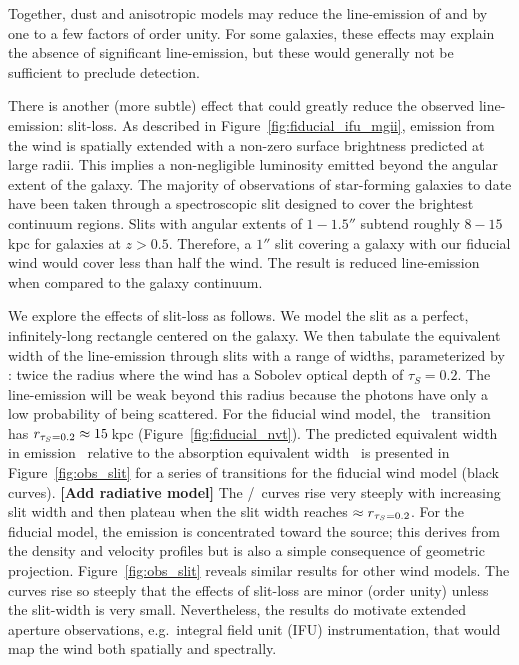 \documentclass[12pt,preprint]{aastex}
\begin{document}
Together, dust and anisotropic models may reduce the line-emission
of  and 
by one to a few factors of order unity.  For some galaxies, these
effects may explain the absence of significant line-emission,
but these would generally
not be sufficient to preclude detection. 

There is another (more subtle) effect that could
greatly reduce the observed line-emission: slit-loss.  As
described in Figure~\ref{fig:fiducial_ifu_mgii}, 
emission from the wind is spatially extended with
a non-zero surface brightness predicted at large radii. This implies 
a non-negligible luminosity emitted beyond the angular extent of the galaxy.  
The majority of observations of star-forming galaxies to date have
been taken through a spectroscopic slit designed to cover
the brightest continuum regions. Slits with angular
extents of $1-1.5''$ subtend roughly $8-15$\,kpc for galaxies at $z>0.5$.
Therefore, a $1''$ slit covering a galaxy with our fiducial wind would cover
less than half the wind.  The result is reduced line-emission
when compared to the galaxy continuum.

We explore the effects of slit-loss as follows.
We model the slit as a perfect, infinitely-long rectangle centered on the
galaxy.  We then tabulate the equivalent width of the line-emission
through slits with a range of widths, parameterized by \rtt: twice the radius
where the wind has a Sobolev optical depth of $\tau_S = 0.2$. 
The line-emission will be weak beyond
this radius because the photons have only a low probability of
being scattered.  For the fiducial wind model, 
the \mgiia\ transition has $r_{\tau_S = 0.2} \approx 15$\,kpc 
(Figure~\ref{fig:fiducial_nvt}).  
The predicted equivalent width in emission \ewe\ relative to the absorption
equivalent width \ewabs\ is presented in
Figure~\ref{fig:obs_slit} for a series of transitions for the fiducial
wind model (black curves).
{\bf [Add radiative model]}
The \ewe/\ewabs\ curves rise very steeply with increasing slit width and then
plateau when the slit width reaches $\approx r_{\tau_S = 0.2}$.  
For the fiducial model, the emission is concentrated toward the source; this
derives from the density and velocity profiles but is also a simple
consequence of geometric projection.
Figure~\ref{fig:obs_slit} reveals similar results for other wind
models. The curves rise so steeply that 
the effects of slit-loss are minor (order unity)
unless the slit-width is very small.   
Nevertheless, the results do motivate
extended aperture observations, e.g.\ integral field unit (IFU)
instrumentation, that would map the wind both spatially and spectrally.
\end{document}
